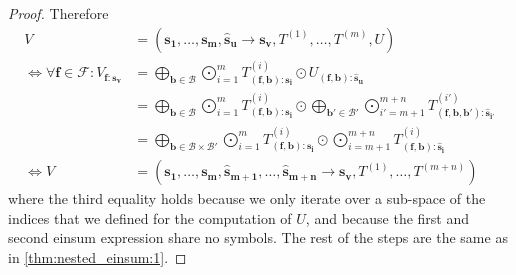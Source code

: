 \begin{proof}
    Therefore
    \begin{align*}
        V                                                         & = (\bm{s_1},\dots,\bm{s_m}, \bm{\hat{s}_u} \rightarrow \bm{s_v}, T^{(1)},\dots,T^{(m)}, U)                                                                                                                                                                \\
        \iff \forall \bm{f} \in \mathcal{F}: V_{\bm{f}: \bm{s_v}} & = \bigoplus\limits_{\bm{b} \in \mathcal{B}} \bigodot\limits_{i = 1}^{m} T^{(i)}_{(\bm{f}, \bm{b}):\bm{s_i}} \odot U_{(\bm{f}, \bm{b}):\bm{\hat{s}_u}}                                                                                                     \\
                                                                  & = \bigoplus\limits_{\bm{b} \in \mathcal{B}} \bigodot\limits_{i = 1}^{m} T^{(i)}_{(\bm{f}, \bm{b}):\bm{s_i}} \odot \bigoplus\limits_{\bm{b'} \in \mathcal{B}'} \bigodot\limits_{i' = m + 1}^{m + n} T^{(i')}_{(\bm{f}, \bm{b}, \bm{b'}):\bm{\hat{s}_{i'}}} \\
                                                                  & = \bigoplus\limits_{\bm{b} \in \mathcal{B} \times \mathcal{B}'} \bigodot\limits_{i = 1}^{m} T^{(i)}_{(\bm{f}, \bm{b}):\bm{s_i}} \odot \bigodot\limits_{i = m + 1}^{m + n} T^{(i)}_{(\bm{f}, \bm{b}):\bm{\hat{s}_i}}                                       \\
        \iff V                                                    & = (\bm{s_1}, \dots, \bm{s_m}, \bm{\hat{s}_{m + 1}}, \dots, \bm{\hat{s}_{m + n}} \rightarrow \bm{s_v}, T^{(1)}, \dots, T^{(m + n)})
    \end{align*}
    where the third equality holds because we only iterate over a sub-space of the indices that we defined for the computation of $U$,
    and because the first and second einsum expression share no symbols.
    The rest of the steps are the same as in \autoref{thm:nested_einsum:1}.
\end{proof}
\bigskip
